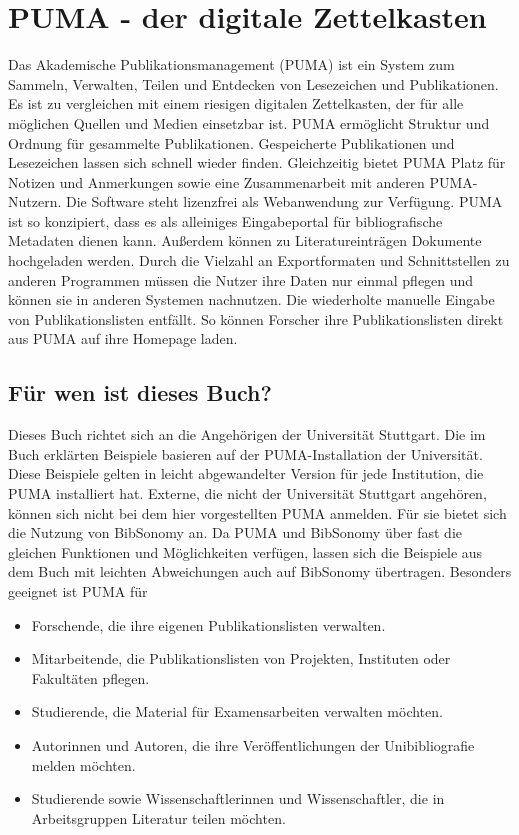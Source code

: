 \chapter{PUMA - der digitale Zettelkasten}
\label{ch:digitaleZettelkasten}
Das Akademische Publikationsmanagement (PUMA) ist ein System zum Sammeln, Verwalten, Teilen 
und Entdecken von Lesezeichen und Publikationen.\newline
Es ist zu vergleichen mit einem riesigen digitalen 
Zettelkasten, der für alle möglichen Quellen und Medien einsetzbar ist. PUMA 
ermöglicht Struktur und Ordnung für gesammelte Publikationen. Gespeicherte 
Publikationen und Lesezeichen lassen sich schnell wieder finden. Gleichzeitig 
bietet PUMA Platz für Notizen und Anmerkungen sowie eine Zusammenarbeit mit 
anderen PUMA-Nutzern. 
Die Software steht lizenzfrei als Webanwendung zur Verfügung.
\newline 
PUMA ist so konzipiert, dass es als alleiniges Eingabeportal für bibliografische Metadaten dienen kann. Außerdem können zu Literatureinträgen Dokumente hochgeladen werden. \newline
Durch die Vielzahl an Exportformaten und Schnittstellen zu anderen Programmen müssen die Nutzer ihre Daten nur einmal pflegen und können sie in anderen Systemen nachnutzen. Die wiederholte manuelle Eingabe von Publikationslisten entfällt. So können Forscher ihre Publikationslisten direkt aus PUMA auf ihre Homepage laden.  
\section{Für wen ist dieses Buch?} 
\label{sec:fuerWen}
Dieses Buch richtet sich an die Angehörigen der Universität Stuttgart.
Die im Buch erklärten Beispiele basieren auf der PUMA-Installation der 
Universität. Diese Beispiele gelten in leicht abgewandelter 
Version für jede Institution, die PUMA installiert hat. 
\newline
Externe, die nicht der Universität Stuttgart angehören, können sich nicht bei 
dem hier vorgestellten PUMA anmelden. Für sie bietet sich die Nutzung 
von BibSonomy an. Da PUMA und BibSonomy über fast die gleichen Funktionen und 
Möglichkeiten verfügen, lassen sich die Beispiele aus dem Buch mit leichten 
Abweichungen auch auf BibSonomy übertragen.\newline
Besonders geeignet ist PUMA für
\begin{itemize}
\item Forschende, die ihre eigenen Publikationslisten verwalten.
\item Mitarbeitende, die Publikationslisten von Projekten, 
Instituten oder Fakultäten pflegen.
\item Studierende, die Material für Examensarbeiten verwalten 
möchten.
\item Autorinnen und Autoren, die ihre Veröffentlichungen der Unibibliografie 
melden möchten.
\item Studierende sowie Wissenschaftlerinnen und Wissenschaftler, 
die in Arbeitsgruppen Literatur teilen möchten.
\end{itemize}
